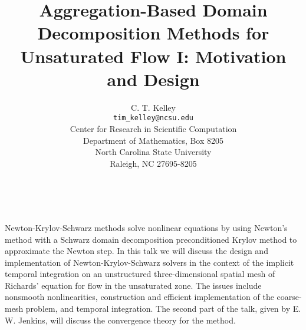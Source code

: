 \documentclass[11pt]{article}
\date{ ~ \hspace{-4mm}}
\title{Aggregation-Based Domain Decomposition Methods for Unsaturated Flow I: Motivation and Design  }
\author{C. T. Kelley \\ {\tt tim\_kelley@ncsu.edu} \\ Center for Research in Scientific Computation \\ Department of Mathematics, Box 8205 \\ North Carolina State University \\ Raleigh, NC 27695-8205}
\begin{document}
\maketitle
\thispagestyle{empty}





 



Newton-Krylov-Schwarz methods solve nonlinear equations by using
Newton's method with a Schwarz domain decomposition preconditioned
Krylov method to approximate the Newton step. In this talk we will discuss
the design and implementation of Newton-Krylov-Schwarz solvers in the
context of the implicit temporal integration on an unstructured
three-dimensional spatial mesh of Richards' equation for flow in the
unsaturated zone. The issues include nonsmooth nonlinearities, construction
and efficient implementation of the coarse-mesh problem, and temporal
integration. The second part of the talk, given by E. W. Jenkins,
will discuss the convergence theory for the method.
\end{document}

